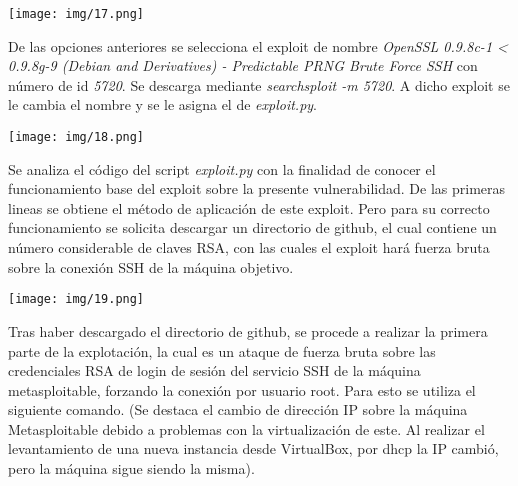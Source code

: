 \documentclass[12pt,oneside,a4paper]{book}
\begin{document}
\begin{enumerate}
\vspace{1em}

\begin{center}
    \texttt{[image: img/17.png]}
\end{center}

\vspace{1em}

\vspace{1em}

\hspace{20pt}
De las opciones anteriores se selecciona el exploit de nombre \textit{OpenSSL 0.9.8c-1 < 0.9.8g-9 (Debian and Derivatives) - Predictable PRNG Brute Force SSH} con número de id \textit{5720}. Se descarga mediante \textit{searchsploit -m 5720}. A dicho exploit se le cambia el nombre y se le asigna el de \textit{exploit.py}.

\vspace{1em}

\begin{center}
    \texttt{[image: img/18.png]}
\end{center}

\vspace{1em}

\hspace{20pt}
Se analiza el código del script \textit{exploit.py} con la finalidad de conocer el funcionamiento base del exploit sobre la presente vulnerabilidad. De las primeras lineas se obtiene el método de aplicación de este exploit. Pero para su correcto funcionamiento se solicita descargar un directorio de github, el cual contiene un número considerable de claves RSA, con las cuales el exploit hará fuerza bruta sobre la conexión SSH de la máquina objetivo.

\vspace{1em}

\begin{center}
    \texttt{[image: img/19.png]}
\end{center}

\vspace{1em}

\hspace{20pt}
Tras haber descargado el directorio de github, se procede a realizar la primera parte de la explotación, la cual es un ataque de fuerza bruta sobre las credenciales RSA de login de sesión del servicio SSH de la máquina metasploitable, forzando la conexión por usuario root. Para esto se utiliza el siguiente comando. (Se destaca el cambio de dirección IP sobre la máquina Metasploitable debido a problemas con la virtualización de este. Al realizar el levantamiento de una nueva instancia desde VirtualBox, por dhcp la IP cambió, pero la máquina sigue siendo la misma).


\end{enumerate}
\end{document}
